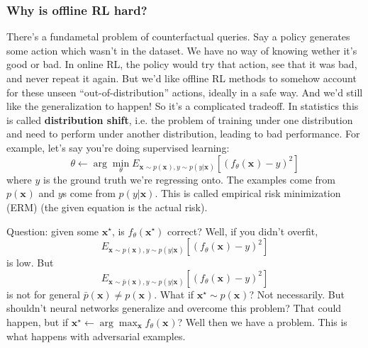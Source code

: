 \documentclass{report}
\newcommand{\argmin}{\arg\!\min}
\newcommand{\argmax}{\arg\!\max}
\begin{document}
\subsubsection{Why is offline RL hard?}
There's a fundametal problem of counterfactual queries.
Say a policy generates some action which wasn't in the dataset.
We have no way of knowing wether it's good or bad. In online RL,
the policy would try that action, see that it was bad, and never repeat it again.
But we'd like offline RL methods to somehow account for these unseen
``out-of-distribution'' actions, ideally in a safe way.
And we'd still like the generalization to happen!
So it's a complicated tradeoff.
In statistics this is called \textbf{distribution shift},
i.e. the problem of training under one distribution and need to perform under another distribution,
leading to bad performance.
For example, let's say you're doing supervised learning:
\begin{equation}
		\theta \leftarrow \argmin_\theta E_{\bm{x}_{} \sim p(\bm{x}_{}), y \sim p(y|\bm{x}_{})} 
		\left[ (f_\theta(\bm{x}_{}) - y)^2 \right] 
\end{equation}
where $y  $ is the ground truth we're regressing onto.
The examples come from $ p(\bm{x}_{}) $ and $y$s come from $ p(y|\bm{x}) $.
This is called empirical risk minimization (ERM)
 (the given equation is the actual risk).

 Question: given some $ \bm{x}_{}^\star $, is $ f_\theta(\bm{x}_{}^\star )$ correct?
 Well, if you didn't overfit,
 \begin{equation}
E_{\bm{x}_{} \sim p(\bm{x}_{}), y \sim p(y|\bm{x}_{})} 
		\left[ (f_\theta(\bm{x}_{}) - y)^2 \right]
\end{equation} 
is low.
But 
\begin{equation}
   	 E_{\bm{x}_{} \sim \bar{p}(\bm{x}_{}), y \sim p(y|\bm{x}_{})} 
   	\left[ (f_\theta(\bm{x}_{}) - y)^2 \right]
\end{equation} 
is not for general $ \bar{p}(\bm{x}) \neq p(\bm{x}_{}) $.
What if $ \bm{x}_{}^\star \sim p(\bm{x}_{}) $?
Not necessarily.
But shouldn't neural networks generalize and overcome this problem?
That could happen, but if
$ \bm{x}_{}^\star \leftarrow \argmax_{\bm{x}} f_\theta(\bm{x}_{}) $?
Well then we have a problem.
This is what happens with adversarial examples.
\end{document}
